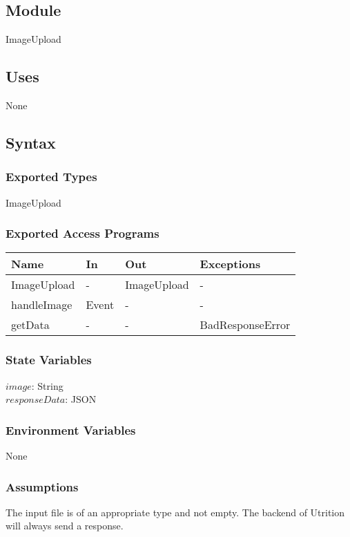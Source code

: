 \documentclass[12pt, titlepage]{article}
\begin{document}
\subsection{Module}
ImageUpload
\subsection{Uses}
None
\subsection{Syntax}
\subsubsection{Exported Types}
ImageUpload
\subsubsection{Exported Access Programs}
\begin{center}
	\begin{tabular}{p{3cm} p{4cm} p{4cm} p{3cm}}
		\hline
		\textbf{Name} & \textbf{In} & \textbf{Out} & \textbf{Exceptions} \\
		\hline
		ImageUpload & - & ImageUpload &- \\
		handleImage & Event & - & - \\
		getData & - & - & BadResponseError \\
		\hline
	\end{tabular}
\end{center}
\subsubsection{State Variables}
$image$: String\\
$responseData$: JSON
\subsubsection{Environment Variables}
None
\subsubsection{Assumptions}
The input file is of an appropriate type and not empty. The backend of Utrition will always send a response.
\end{document}
